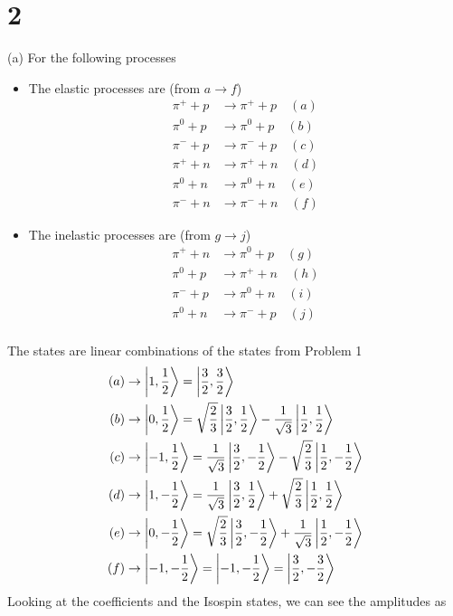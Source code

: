 \documentclass[../main.tex]{subfiles}
\begin{document}
\section*{2}
(a) For the following processes
\begin{itemize}
    \item The elastic processes are (from $a \to f$)
    \begin{align*}
        \pi^+ + p &\rightarrow \pi^+ + p \quad (a) \\
        \pi^0 + p &\rightarrow \pi^0 + p \quad (b) \\
        \pi^- + p &\rightarrow \pi^- + p \quad (c) \\
        \pi^+ + n &\rightarrow \pi^+ + n \quad (d) \\
        \pi^0 + n &\rightarrow \pi^0 + n \quad (e) \\
        \pi^- + n &\rightarrow \pi^- + n \quad (f)
    \end{align*}
    \item The inelastic processes are (from $g \to j$)
    \begin{align*}
        \pi^+ + n &\to \pi^0 + p \quad (g) \\
        \pi^0 + p &\to \pi^+ + n \quad (h) \\
        \pi^- + p &\to \pi^0 + n \quad (i) \\
        \pi^0 + n &\to \pi^- + p \quad (j) \\
    \end{align*}
\end{itemize}
The states are linear combinations of the states from Problem 1
\newcommand{\stwo}{\sqrt{\frac{2}{3}}}
\newcommand{\sthree}{\frac{1}{\sqrt{3}}}
\begin{align*}
    (a) &\rightarrow \ket{1,\ohf} = \ket{\thf, \thf}\\
    (b) &\rightarrow \ket{0,\ohf} = \stwo \ket {\thf, \ohf} - \sthree  \ket{\ohf, \ohf} \\
    (c) &\rightarrow \ket{-1,\ohf} = \sthree \ket{\thf, -\ohf} - \stwo \ket{\ohf, -\ohf} \\
    (d) &\rightarrow \ket{1,-\ohf} = \sthree \ket{\thf, \ohf} + \stwo \ket{\ohf, \ohf} \\
    (e) &\rightarrow \ket{0,-\ohf} = \stwo \ket{\thf, -\ohf} + \sthree \ket{\ohf, -\ohf} \\
    (f) &\rightarrow \ket{-1,-\ohf} = \ket{-1,-\ohf} = \ket{\thf, -\thf}
\end{align*}
Looking at the coefficients and the Isospin states, we can see the amplitudes as
\end{document}
